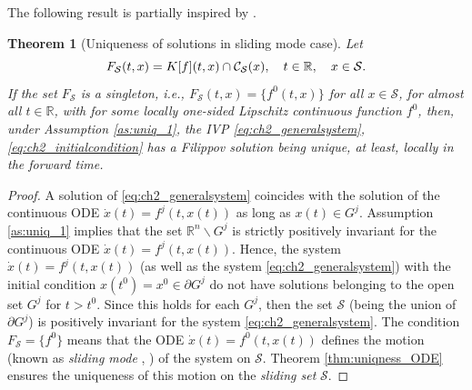 \documentclass{article}
\newcommand{\R}{\mathbb{R}}
\newtheorem{theorem}{Theorem}
\begin{document}
 The following result is partially inspired by \cite[\S 10]{Filippov1988:Book}. 
\begin{theorem}[\small Uniqueness of solutions in sliding mode case]\label{thm:unique_SM}\itshape
	Let\vspace{-1mm} 
		\begin{equation}
		F_{\mathcal{S}}(t,x)= K[f](t,x)\cap\mathcal{C}_{\mathcal{S}}(x), \quad t\in \R, \quad x\in \mathcal{S}.\vspace{-1mm}
		\end{equation}
 If the set 
  $F_{\mathcal{S}}$ is a singleton, i.e., $F_{\mathcal{S}}(t,x)=\{f^0(t,x)\}$ for all $x\in \mathcal{S}$, for almost all $t\in \R$, with
 for some locally {one-sided} Lipschitz continuous function $f^0$, then,  {under  Assumption \ref{as:uniq_1},}  
  the IVP  \eqref{eq:ch2_generalsystem}, \eqref{eq:ch2_initialcondition}  has a Filippov solution 
   being unique,  at least, locally in the forward time. 	
\end{theorem}
\begin{proof}
A solution of \eqref{eq:ch2_generalsystem} coincides with the solution of the continuous ODE $\dot x(t)=f^j(t,x(t))$ as long as $x(t)\in G^j$.
 {Assumption \ref{as:uniq_1}} implies that 
the set $\R^n\backslash  G^j$ is strictly positively invariant 
for the  continuous ODE $\dot x(t)=f^j(t,x(t))$.
Hence, the system $\dot x(t)=f^j(t,x(t))$ (as well as the system \eqref{eq:ch2_generalsystem}) with the initial condition $x(t^0)=x^0\in \partial G^j$ do not have solutions belonging to  the open set $G^j$ for $t>t^0$.
Since this holds for each $G^j$, then the set $\mathcal{S}$ (being the  union of $\partial G^j$)  is  positively invariant for the system
\eqref{eq:ch2_generalsystem}.
{The condition $F_{\mathcal{S}}=\{f^0\}$} means that the ODE $\dot x(t)=f^0(t,x(t))$ defines the motion (known as \textit{sliding mode} \cite{Utkin1992:Book}, \cite{Filippov1988:Book}) of the system on $\mathcal{S}$.  {Theorem \ref{thm:uniqness_ODE}} ensures the uniqueness of this motion on the \textit{sliding set} $\mathcal{S}$.  
\end{proof}
\end{document}
